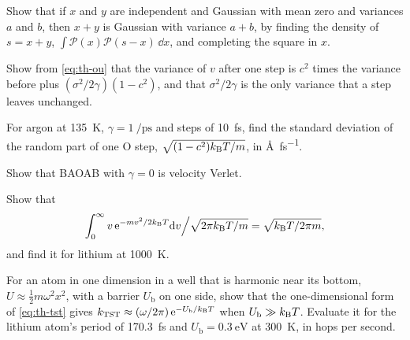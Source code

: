 \begin{exercise}
\label{ex:th-gauss-sum}
Show that if $x$ and $y$ are independent and Gaussian with mean zero and
variances $a$ and $b$, then $x + y$ is Gaussian with variance $a + b$,
by finding the density of $s = x + y$, $\int\mathcal{P}(x)\mathcal{P}(s -
x)\,\dd x$, and completing the square in $x$.
\end{exercise}

\begin{exercise}
\label{ex:th-ou-variance}
Show from \cref{eq:th-ou} that the variance of $v$ after one step is
$c^2$ times the variance before plus $(\sigma^2/2\gamma)(1 - c^2)$, and
that $\sigma^2/2\gamma$ is the only variance that a step leaves unchanged.
\end{exercise}

\begin{exercise}
\label{ex:th-noise}
For argon at \SI{135}{\kelvin}, $\gamma = \SI{1}{\per\pico\second}$ and
steps of \SI{10}{\femto\second}, find the standard deviation of the
random part of one O step, $\sqrt{(1 - c^2)k_{\mathrm{B}} T/m}$, in
\si{\angstrom\per\femto\second}.
\end{exercise}

\begin{exercise}
\label{ex:th-baoab-vv}
Show that BAOAB with $\gamma = 0$ is velocity Verlet.
\end{exercise}

\begin{exercise}
\label{ex:th-flux}
Show that
\begin{equation*}
   \int_0^\infty v\,\mathrm{e}^{-mv^2/2k_{\mathrm{B}} T}\mathrm{d} v\Big/\sqrt{2\pi k_{\mathrm{B}} T/m}
   = \sqrt{k_{\mathrm{B}} T/2\pi m} ,
\end{equation*}
and find it for lithium at \SI{1000}{\kelvin}.
\end{exercise}

\begin{exercise}
\label{ex:th-tst-1d}
For an atom in one dimension in a well that is harmonic near its bottom,
$U \approx \frac12m\omega^2x^2$, with a barrier $U_{\mathrm b}$ on one
side, show that the one-dimensional form of \cref{eq:th-tst} gives
$k_{\mathrm{TST}} \approx (\omega/2\pi)\,\mathrm{e}^{-U_{\mathrm b}/k_{\mathrm{B}}
T}$ when $U_{\mathrm b} \gg k_{\mathrm{B}} T$. Evaluate it for the lithium atom's
period of \SI{170.3}{\femto\second} and $U_{\mathrm b} =
\SI{0.3}{\electronvolt}$ at \SI{300}{\kelvin}, in hops per second.
\end{exercise}

